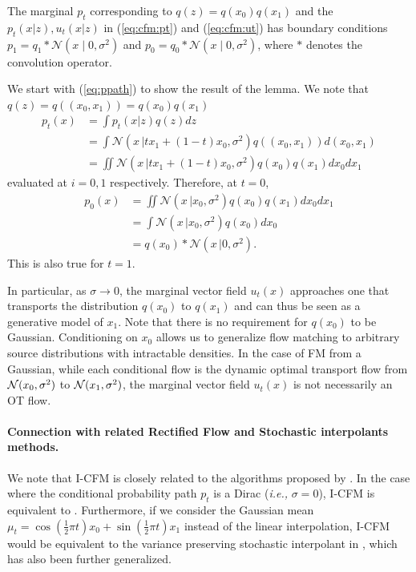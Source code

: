 \documentclass[10pt]{article}
\theoremstyle{plain}
\theoremstyle{definition}
\theoremstyle{remark}
\begin{document}
\begin{propositionE}\label{lem:cfm}
The marginal $p_t$ corresponding to $q(z)=q(x_0)q(x_1)$ and the $p_t(x | z),u_t(x | z)$ in (\ref{eq:cfm:pt}) and (\ref{eq:cfm:ut}) has boundary conditions $p_1 = q_1 \ast \mathcal{N}(x \mid 0, \sigma^2)$ and $p_0 = q_0 \ast \mathcal{N}(x \mid 0, \sigma^2)$, where $\ast$ denotes the convolution operator.
\end{propositionE}
\begin{proofE}
We start with (\ref{eq:ppath}) to show the result of the lemma. We note that $q(z) = q((x_0, x_1)) = q(x_0) q(x_1)$
\begin{align*}
p_t(x) &= \int p_t(x | z) q(z) dz \\
&= \int  \mathcal{N}(x \, |t x_1 + (1 - t) x_0, \sigma^2) q((x_0, x_1)) d(x_0, x_1) \\
&= \iint  \mathcal{N}(x \,|t x_1 + (1 - t) x_0, \sigma^2) q(x_0) q(x_1) d x_0 d x_1
\end{align*}
evaluated at $i = 0, 1$ respectively. Therefore, at $t=0$,
\begin{align*}
p_0(x) &= \iint \mathcal{N} (x \,| x_0,\sigma^2) q(x_0) q(x_1) d x_0 d x_1 \\
       &= \int \mathcal{N}(x \,| x_0,\sigma^2) q(x_0) d x_0\\
       &= q(x_0) \ast \mathcal{N}(x \,| 0, \sigma^2).
\end{align*}
This is also true for $t=1$. 
\end{proofE}
In particular, as $\sigma\to0$, the marginal vector field $u_t(x)$ approaches one that transports the distribution $q(x_0)$ to $q(x_1)$ and can thus be seen as a generative model of $x_1$. Note that there is no requirement for $q(x_0)$ to be Gaussian. Conditioning on $x_0$ allows us to generalize flow matching to arbitrary source distributions with intractable densities. In the case of FM from a Gaussian, while each conditional flow is the dynamic optimal transport flow from ${\mathcal{N}}(x_0,\sigma^2)$ to ${\mathcal{N}}(x_1,\sigma^2)$, the marginal vector field $u_t(x)$ is not necessarily an OT flow. 
 
\paragraph{Connection with related Rectified Flow and Stochastic interpolants methods.}
{We note that I-CFM is closely related to the algorithms proposed by \citet{albergo_building_2023,liu_rectified_2022}. In the case where the conditional probability path $p_t$ is a Dirac (\emph{i.e., } $\sigma = 0$), I-CFM is equivalent to \citep{liu_rectified_2022}. Furthermore, if we consider the Gaussian mean $\mu_t = \cos(\frac{1}{2} \pi t) x_0 + \sin (\frac{1}{2} \pi t) x_1$ instead of the linear interpolation, I-CFM would be equivalent to the variance preserving stochastic interpolant in \citet{albergo_building_2023}, which has also been further generalized.}
\end{document}

